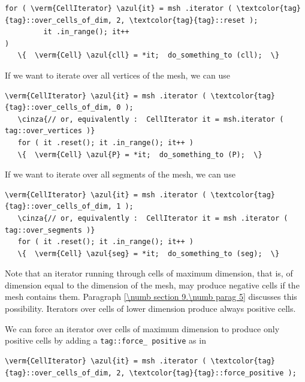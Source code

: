 \begin{Verbatim}[commandchars=\\\{\},formatcom=\small\tt,
   baselinestretch=0.94,framesep=2mm                      ]
   for ( \verm{CellIterator} \azul{it} = msh .iterator ( \textcolor{tag}{tag}::over_cells_of_dim, 2, \textcolor{tag}{tag}::reset );
         it .in_range(); it++                                                       )
   \{  \verm{Cell} \azul{cll} = *it;  do_something_to (cll);  \}
\end{Verbatim}

If we want to iterate over all vertices of the mesh, we can use

\begin{Verbatim}[commandchars=\\\{\},formatcom=\small\tt,
   baselinestretch=0.94,framesep=2mm                      ]
   \verm{CellIterator} \azul{it} = msh .iterator ( \textcolor{tag}{tag}::over_cells_of_dim, 0 );
   \cinza{// or, equivalently :  CellIterator it = msh.iterator ( tag::over_vertices )}
   for ( it .reset(); it .in_range(); it++ )
   \{  \verm{Cell} \azul{P} = *it;  do_something_to (P);  \}
\end{Verbatim}

If we want to iterate over all segments of the mesh, we can use

\begin{Verbatim}[commandchars=\\\{\},formatcom=\small\tt,
   baselinestretch=0.94,framesep=2mm                      ]
   \verm{CellIterator} \azul{it} = msh .iterator ( \textcolor{tag}{tag}::over_cells_of_dim, 1 );
   \cinza{// or, equivalently :  CellIterator it = msh .iterator ( tag::over_segments )}
   for ( it .reset(); it .in_range(); it++ )
   \{  \verm{Cell} \azul{seg} = *it;  do_something_to (seg);  \}
\end{Verbatim}

Note that an iterator running through cells of maximum dimension, that is, of dimension equal
to the dimension of the mesh, may produce negative cells if the mesh contains them.
Paragraph \ref{\numb section 9.\numb parag 5} discusses this possibility.
Iterators over cells of lower dimension produce always positive cells.

We can force an iterator over cells of maximum dimension to produce only positive cells
by adding a {\small\tt \textcolor{tag}{tag}::force\_\,positive} as in

\begin{Verbatim}[commandchars=\\\{\},formatcom=\small\tt,
   baselinestretch=0.94,framesep=2mm                      ]
   \verm{CellIterator} \azul{it} = msh .iterator ( \textcolor{tag}{tag}::over_cells_of_dim, 2, \textcolor{tag}{tag}::force_positive );
\end{Verbatim}

